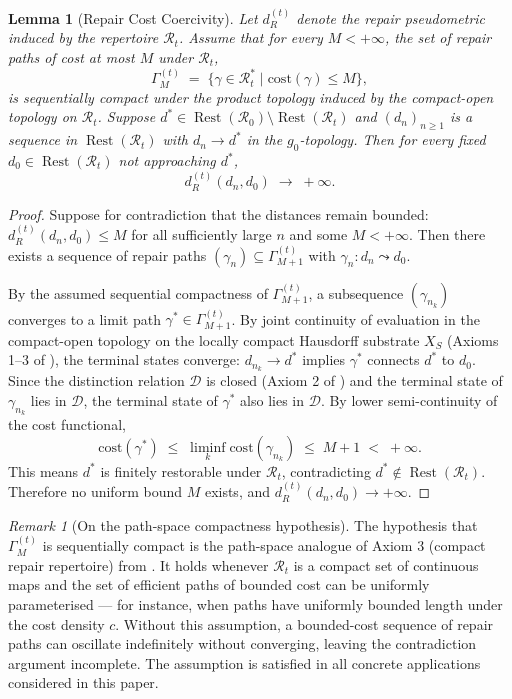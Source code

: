 \documentclass[12pt, oneside]{article}
\theoremstyle{plain}
\newtheorem{lemma}[theorem]{Lemma}
\theoremstyle{definition}
\theoremstyle{remark}
\newtheorem{remark}[theorem]{Remark}
\DeclareMathOperator{\Rest}{Rest}
\newcommand{\Rt}{\mathcal{R}_t}
\newcommand{\Rzero}{\mathcal{R}_0}
\newcommand{\Restzt}{\Rest(\Rt)}
\newcommand{\Restzero}{\Rest(\Rzero)}
\newcommand{\gzero}{g_0}
\newcommand{\Dsub}{\mathcal{D}}
\newcommand{\Xsub}{X_S}
\begin{document}
\begin{lemma}[Repair Cost Coercivity]
  Let $d_R^{(t)}$ denote the repair pseudometric induced by the
  repertoire $\Rt$.
  Assume that for every $M < +\infty$, the set of repair paths of
  cost at most $M$ under $\Rt$,
  \[
    \Gamma_M^{(t)}
    \;=\;
    \bigl\{
      \gamma \in \Rt^* \;\big|\; \mathrm{cost}(\gamma) \leq M
    \bigr\},
  \]
  is sequentially compact under the product topology induced by the
  compact-open topology on $\Rt$.
  Suppose $d^* \in \Restzero \setminus \Restzt$ and
  $(d_n)_{n \geq 1}$ is a sequence in $\Restzt$ with
  $d_n \to d^*$ in the $\gzero$-topology.
  Then for every fixed $d_0 \in \Restzt$ not approaching $d^*$,
  \[
    d_R^{(t)}(d_n, d_0) \;\to\; +\infty.
  \]
  \label{lem:coercivity}
\end{lemma}

\begin{proof}
  Suppose for contradiction that the distances remain bounded:
  $d_R^{(t)}(d_n, d_0) \leq M$ for all sufficiently large $n$
  and some $M < +\infty$.
  Then there exists a sequence of repair paths
  $(\gamma_n) \subseteq \Gamma_{M+1}^{(t)}$ with
  $\gamma_n : d_n \leadsto d_0$.

  By the assumed sequential compactness of $\Gamma_{M+1}^{(t)}$,
  a subsequence $(\gamma_{n_k})$ converges to a limit path
  $\gamma^* \in \Gamma_{M+1}^{(t)}$.
  By joint continuity of evaluation in the compact-open topology
  on the locally compact Hausdorff substrate $\Xsub$
  (Axioms 1--3 of \cite{Flyxion2026a}), the terminal states
  converge: $d_{n_k} \to d^*$ implies $\gamma^*$ connects $d^*$
  to $d_0$.
  Since the distinction relation $\Dsub$ is closed
  (Axiom 2 of \cite{Flyxion2026a}) and the terminal state of
  $\gamma_{n_k}$ lies in $\Dsub$, the terminal state of $\gamma^*$
  also lies in $\Dsub$.
  By lower semi-continuity of the cost functional,
  \[
    \mathrm{cost}(\gamma^*) \;\leq\; \liminf_k \mathrm{cost}(\gamma_{n_k})
    \;\leq\; M + 1 \;<\; +\infty.
  \]
  This means $d^*$ is finitely restorable under $\Rt$,
  contradicting $d^* \notin \Restzt$.
  Therefore no uniform bound $M$ exists, and
  $d_R^{(t)}(d_n, d_0) \to +\infty$.
\end{proof}

\begin{remark}[On the path-space compactness hypothesis]
  The hypothesis that $\Gamma_M^{(t)}$ is sequentially compact is
  the path-space analogue of Axiom 3 (compact repair repertoire)
  from \cite{Flyxion2026a}.
  It holds whenever $\Rt$ is a compact set of continuous maps and
  the set of efficient paths of bounded cost can be uniformly
  parameterised --- for instance, when paths have uniformly bounded
  length under the cost density $c$.
  Without this assumption, a bounded-cost sequence of repair paths
  can oscillate indefinitely without converging, leaving the
  contradiction argument incomplete.
  The assumption is satisfied in all concrete applications
  considered in this paper.
\end{remark}
\end{document}
